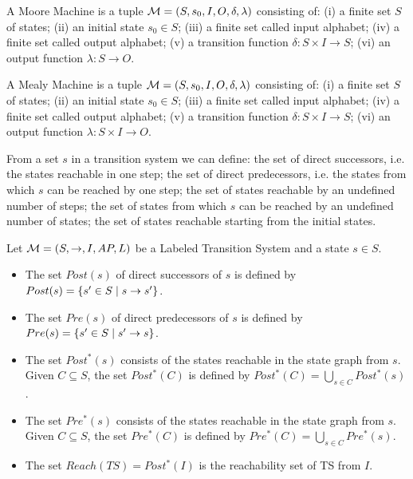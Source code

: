 \begin{definition}
A Moore Machine is a tuple $\mathcal{M} = \left( S,s_0,I,O,\delta,\lambda \right)$ consisting of: (i) a finite set $S$ of states; (ii) an initial state $s_0 \in S$; (iii) a finite set called input alphabet; (iv) a finite set called output alphabet; (v) a transition function $\delta \colon S \times I \to S$; (vi) an output function $\lambda \colon S \to O$.
\end{definition}

\begin{definition}
A Mealy Machine is a tuple $\mathcal{M} = \left( S,s_0,I,O,\delta,\lambda \right)$ consisting of: (i) a finite set $S$ of states; (ii) an initial state $s_0 \in S$; (iii) a finite set called input alphabet; (iv) a finite set called output alphabet; (v) a transition function $\delta \colon S \times I \to S$; (vi) an output function $\lambda \colon S \times I \to O$.
\end{definition}

From a set $s$ in a transition system we can define: the set of direct successors, i.e. the states reachable in one step; the set of direct predecessors, i.e. the states from which $s$ can be reached by one step; the set of states reachable by an undefined number of steps; the set of states from which $s$ can be reached by an undefined number of states; the set of states reachable starting from the initial states.

\begin{definition}
Let $\mathcal{M} = \left( S, \to, I, AP, L \right)$ be a Labeled Transition System and a state $s \in S$.
\begin{itemize}
    \item The set $Post(s)$ of direct successors of $s$ is defined by $Post(s) = \{ s' \in S \; | \; s \to s' \}$.
    \item The set $Pre(s)$ of direct predecessors of $s$ is defined by $Pre(s) = \{ s' \in S \; | \; s' \to s \}$.
    \item The set $Post^*(s)$ consists of the states reachable in the state graph from $s$. Given $C \subseteq S$, the set $Post^*(C)$ is defined by $Post^*(C) = \bigcup_{s \in C} Post^*(s)$.
    \item The set $Pre^*(s)$ consists of the states reachable in the state graph from $s$. Given $C \subseteq S$, the set $Pre^*(C)$ is defined by $Pre^*(C) = \bigcup_{s \in C} Pre^*(s)$.
    \item The set $Reach(TS) = Post^*(I)$ is the reachability set of TS from $I$.
\end{itemize}
\end{definition}

